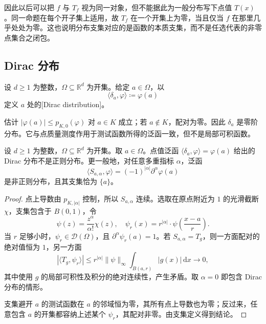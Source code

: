 因此以后可以把 \(f\) 与 \(T_f\) 视为同一对象，但不能据此为一般分布写下点值 \(T(x)\)。同一命题在每个开子集上适用，故 \(T_f\) 在一个开集上为零，当且仅当 \(f\) 在那里几乎处处为零。这也说明分布支集对应的是函数的本质支集，而不是任选代表的非零点集合之闭包。

\subsection{Dirac 分布}
\label{b1:subsec:200203}

\begin{definition}\label{b1:def:dirac-distribution}
设 \(d\geq1\) 为整数，\(\Omega\subseteq\mathbb R^d\) 为开集。给定 \(a\in\Omega\)，以
\[
 \langle\delta_a,\varphi\rangle\coloneqq\varphi(a)
\]
定义 \(a\) 处的[Dirac distribution]。
\end{definition}

估计 \(|\varphi(a)|\leq p_{K,0}(\varphi)\) 对 \(a\in K\) 成立；若 \(a\notin K\)，配对为零。因此 \(\delta_a\) 是零阶分布。它与点质量测度作用于测试函数所得的泛函一致，但不是局部可积函数。

\begin{proposition}\label{b1:prop:dirac-not-regular}
设 \(d\geq1\) 为整数，\(\Omega\subseteq\mathbb R^d\) 为开集。取 \(a\in\Omega\)。点值泛函 \(\langle\delta_a,\varphi\rangle=\varphi(a)\) 给出的 Dirac 分布不是正则分布。更一般地，对任意多重指标 \(\alpha\)，泛函
\[
 \langle S_{a,\alpha},\varphi\rangle
 =(-1)^{|\alpha|}\partial^\alpha\varphi(a)
\]
是非正则分布，且其支集恰为 \(\{a\}\)。
\end{proposition}
\begin{proof}
点上导数由 \(p_{K,|\alpha|}\) 控制，所以 \(S_{a,\alpha}\) 连续。选取在原点附近为 \(1\) 的光滑截断 \(\chi\)，支集包含于 \(B(0,1)\)，令
\[
 \psi(z)=\frac{z^\alpha}{\alpha!}\chi(z),\quad
 \psi_r(x)=r^{|\alpha|}\cdot \psi\left(\frac{x-a}r\right).
\]
当 \(r\) 足够小时，\(\psi_r\in\mathcal D(\Omega)\)，且 \(\partial^\alpha\psi_r(a)=1\)。若 \(S_{a,\alpha}=T_g\)，则一方面配对的绝对值恒为 \(1\)，另一方面
\[
 |\langle T_g,\psi_r\rangle|
 \leq r^{|\alpha|}\|\psi\|_\infty
            \int_{B(a,r)}|g(x)|\,\mathrm dx
 \longrightarrow0,
\]
其中使用 \(g\) 的局部可积性及积分的绝对连续性，产生矛盾。取 \(\alpha=0\) 即包含 Dirac 分布的情形。

支集避开 \(a\) 的测试函数在 \(a\) 的邻域恒为零，其所有点上导数也为零；反过来，任意包含 \(a\) 的开集都容纳上述某个 \(\psi_r\)，其配对非零。由支集定义得到结论。
\end{proof}


